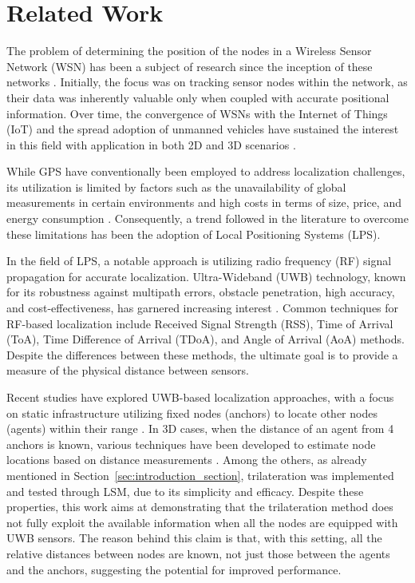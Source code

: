 \section{Related Work}\label{sec:related_work}
The problem of determining the position of the nodes in a Wireless Sensor Network (WSN) has been a subject of research since the inception of these networks \cite{doherty_convex_2001, corbalan_self-localization_2023}.
Initially, the focus was on tracking sensor nodes within the network, as their data was inherently valuable only when coupled with accurate positional information. 
Over time, the convergence of WSNs with the Internet of Things (IoT) and the spread adoption of unmanned vehicles have sustained the interest in this field with application in both 2D and 3D scenarios \cite{popescu_survey_2019}.

While GPS have conventionally been employed to address localization challenges, its utilization is limited by factors such as the unavailability of global measurements in certain environments and high costs in terms of size, price, and energy consumption \cite{doherty_convex_2001}. 
Consequently, a trend followed in the literature to overcome these limitations has been the adoption of Local Positioning Systems (LPS).

In the field of LPS, a notable approach is utilizing radio frequency (RF) signal propagation for accurate localization. Ultra-Wideband (UWB) technology, known for its robustness against multipath errors, obstacle penetration, high accuracy, and cost-effectiveness, has garnered increasing interest \cite{santoro_uwb-based_2023, niculescu_energy-efficient_2023, queralta_uwb-based_2020}. Common techniques for RF-based localization include Received Signal Strength (RSS), Time of Arrival (ToA), Time Difference of Arrival (TDoA), and Angle of Arrival (AoA) methods. Despite the differences between these methods, the ultimate goal is to provide a measure of the physical distance between sensors.

Recent studies have explored UWB-based localization approaches, with a focus on static infrastructure utilizing fixed nodes (anchors) to locate other nodes (agents) within their range \cite{almansa_autocalibration_2020, patwari_locating_2005}. 
In 3D cases, when the distance of an agent from 4 anchors is known, various techniques have been developed to estimate node locations based on distance measurements \cite[Chapters 23-27]{zekavat_handbook_2012}. Among the others, as already mentioned in Section~\ref{sec:introduction_section}, trilateration was implemented and tested through LSM, due to its simplicity and efficacy.
Despite these properties, this work aims at demonstrating that the trilateration method does not fully exploit the available information when all the nodes are equipped with UWB sensors. The reason behind this claim is that, with this setting, all the relative distances between nodes are known, not just those between the agents and the anchors, suggesting the potential for improved performance.

